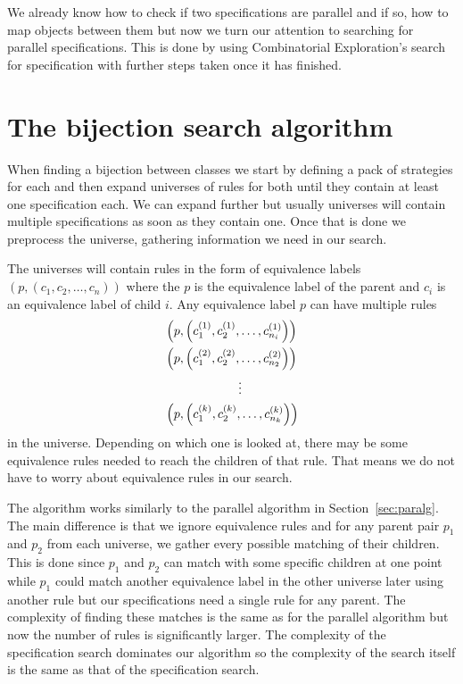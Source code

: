 \label{ch:search}
We already know how to check if two specifications are parallel and if so, how to map objects between them but now we turn our attention to searching for parallel specifications. This is done by using Combinatorial Exploration's search for specification with further steps taken once it has finished.

\section{The bijection search algorithm}
When finding a bijection between classes we start by defining a pack of strategies for each and then expand universes of rules for both until they contain at least one specification each. We can expand further but usually universes will contain multiple specifications as soon as they contain one. Once that is done we preprocess the universe, gathering information we need in our search.

The universes will contain rules in the form of equivalence labels $(p, (c_1,c_2,\dotsc,c_n))$ where the $p$ is the equivalence label of the parent and $c_i$ is an equivalence label of child $i$. Any equivalence label $p$ can have multiple rules
\begin{align*}
    &\left(p, \left(c^{(1)}_1, c^{(1)}_2, \dotsc, c^{(1)}_{n_i}\right)\right)\\
    &\left(p, \left(c^{(2)}_1, c^{(2)}_2, \dotsc, c^{(2)}_{n_2}\right)\right)\\
    &\hspace{2.1cm}\vdots\\
    &\left(p, \left(c^{(k)}_1, c^{(k)}_2, \dotsc, c^{(k)}_{n_k}\right)\right)
\end{align*}
in the universe. Depending on which one is looked at, there may be some equivalence rules needed to reach the children of that rule. That means we do not have to worry about equivalence rules in our search.

The algorithm works similarly to the parallel algorithm in Section~\ref{sec:paralg}. The main difference is that we ignore equivalence rules and for any parent pair $p_1$ and $p_2$ from each universe, we gather every possible matching of their children. This is done since $p_1$ and $p_2$ can match with some specific children at one point while $p_1$ could match another equivalence label in the other universe later using another rule but our specifications need a single rule for any parent. The complexity of finding these matches is the same as for the parallel algorithm but now the number of rules is significantly larger. The complexity of the specification search dominates our algorithm so the complexity of the search itself is the same as that of the specification search.

